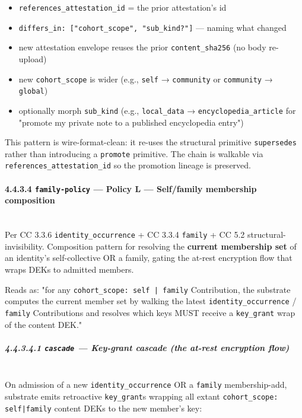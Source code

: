 \documentclass[11pt]{article}
\begin{document}
\begin{itemize}\setlength\itemsep{0pt}
\item \texttt{references\_attestation\_id} = the prior attestation's id
\item \texttt{differs\_in: ["cohort\_scope", "sub\_kind?"]} — naming what changed
\item new attestation envelope reuses the prior \texttt{content\_sha256} (no body re-upload)
\item new \texttt{cohort\_scope} is wider (e.g., \texttt{self} → \texttt{community} or \texttt{community} → \texttt{global})
\item optionally morph \texttt{sub\_kind} (e.g., \texttt{local\_data} → \texttt{encyclopedia\_article} for "promote my private note to a published encyclopedia entry")
\end{itemize}


This pattern is wire-format-clean: it re-uses the structural primitive \texttt{supersedes} rather than introducing a \texttt{promote} primitive. The chain is walkable via \texttt{references\_attestation\_id} so the promotion lineage is preserved.


\paragraph{4.4.3.4 \texttt{family-policy} — Policy L — Self/family membership composition}\mbox{}\\


Per CC 3.3.6 \texttt{identity\_occurrence} + CC 3.3.4 \texttt{family} + CC 5.2 structural-invisibility. Composition pattern for resolving the \textbf{current membership set} of an identity's self-collective OR a family, gating the at-rest encryption flow that wraps DEKs to admitted members.


Reads as: "for any \texttt{cohort\_scope: self | family} Contribution, the substrate computes the current member set by walking the latest \texttt{identity\_occurrence} / \texttt{family} Contributions and resolves which keys MUST receive a \texttt{key\_grant} wrap of the content DEK."


\subparagraph{4.4.3.4.1 \texttt{cascade} — Key-grant cascade (the at-rest encryption flow)}\mbox{}\\


On admission of a new \texttt{identity\_occurrence} OR a \texttt{family} membership-add, substrate emits retroactive \texttt{key\_grant}s wrapping all extant \texttt{cohort\_scope: self|family} content DEKs to the new member's key:
\end{document}
